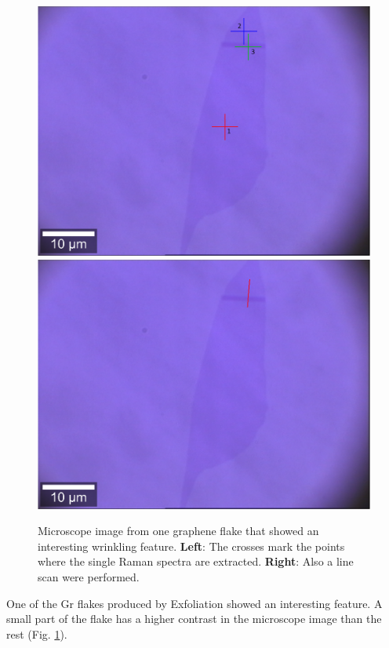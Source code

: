 \documentclass[12pt,a4paper]{article}
\begin{document}
\begin{figure}
\centering
\includegraphics[scale=0.3]{Bilder/Wrinkle/mono_single_spectra.PNG}
\includegraphics[scale=0.22]{Bilder/Wrinkle/mono_line_scan.PNG}
\caption{Microscope image from one graphene flake that showed an interesting wrinkling feature. \textbf{Left}: The crosses mark the points where the single Raman spectra are extracted. \textbf{Right}: Also a line scan were performed.}
\label{fig:wrinkle_microscope}
\end{figure}

One of the Gr flakes produced by Exfoliation showed an interesting feature. A small part of the flake has a higher contrast in the microscope image than the rest (Fig. \ref{fig:wrinkle_microscope}).
\end{document}
